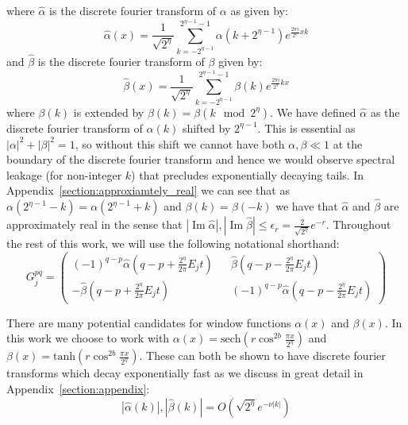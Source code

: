 \documentclass[aps,floatfix,10pt,amssymb,amsfont,amsmath,superscriptaddress,float,nofootinbib,longbibliography,nobalancelastpage,twocolumn]{revtex4-2}
\begin{document}
\begin{widetext}
where $\hat \alpha$ is the discrete fourier transform of $\alpha$ as given by:
\begin{equation}
   \hat\alpha(x) =\frac{1}{\sqrt{2^{\eta}}}\sum_{k=-2^{\eta-1}}^{2^{\eta-1}-1} \alpha(k+2^{\eta-1})e^{\frac{2\pi i}{2^{\eta}}xk}
\end{equation}
and $\hat \beta$ is the discrete fourier transform of $\beta$ given by:
\begin{equation}
    \hat\beta(x) =\frac{1}{\sqrt{2^{\eta}}}\sum_{k=-2^{\eta-1}}^{2^{\eta-1}-1} \beta(k)e^{\frac{2\pi i}{2^{\eta}}kx}
\end{equation}
 where $\beta(k)$ is extended by $\beta(k) = \beta(k \mod 2^{\eta})$. We have defined $\hat \alpha$ as the discrete fourier transform of $\alpha(k)$ shifted by $2^{\eta-1}$. This is essential as $|\alpha|^2+|\beta|^2=1$, so without this shift we cannot have both $\alpha, \beta \ll1$ at the boundary of the discrete fourier transform and hence we would observe spectral leakage (for non-integer $k$) that precludes exponentially decaying tails. In Appendix~\ref{section:approxiamtely_real} we can see that as $\alpha(2^{\eta-1} - k) = \alpha(2^{\eta-1}+k)$ and $\beta(k) = \beta(-k)$ we have that $\hat \alpha$ and $\hat \beta$ are approximately real in the sense that $|\operatorname{Im}\hat \alpha|,|\operatorname{Im}\hat \beta| \leq \epsilon_r = \frac{2}{\sqrt{2^{\eta}}}e^{-r}$. Throughout the rest of this work, we will use the following notational shorthand: 
\begin{equation}
    G_j^{pq} = \begin{pmatrix}
        (-1)^{q-p}\hat\alpha(q-p+\frac{2^{\eta}}{2\pi}E_jt) && \hat\beta(q-p-\frac{2^{\eta}}{2\pi}E_jt)\\
        -\hat\beta (q-p+\frac{2^{\eta}}{2\pi}E_jt) && (-1)^{q-p}\hat\alpha(q-p-\frac{2^{\eta}}{2\pi}E_jt)
    \end{pmatrix}
\end{equation}
\end{widetext}
There are many potential candidates for window functions $\alpha(x)$ and $\beta(x)$. In this work we choose to work with $\alpha(x) = \text{sech}( r\cos^{2b} \frac{\pi x}{2^{\eta}})$ and $\beta(x) = \text{tanh}(r \cos^{2b} \frac{\pi x}{2^{\eta}})$. These can both be shown to have discrete fourier transforms which decay exponentially fast as we discuss in great detail in Appendix~\ref{section:appendix}:
\begin{equation}
    |\hat \alpha(k)|,|\hat \beta(k)| = O\left( \sqrt{2^{\eta}}e^{-\nu |k|}\right)
\end{equation}
\end{document}
